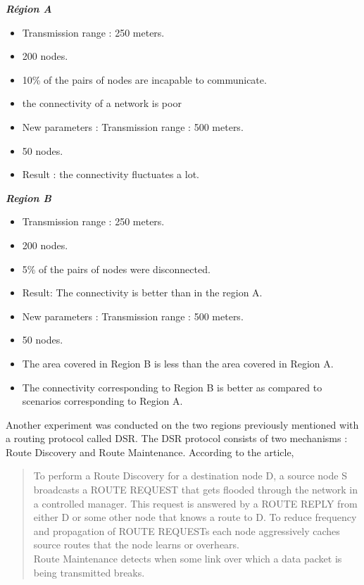 \begin{multicols}{2}
\textit{\textbf{Région A}}
\begin{itemize}
\item Transmission range : 250 meters.
\item 200 nodes.
\item 10\% of the pairs of nodes are incapable to communicate.
\item the connectivity of a network is poor
\item New parameters : Transmission range : 500 meters.
\item 50 nodes.
\item Result : the connectivity fluctuates a lot.
\end{itemize}
\columnbreak
\textit{\textbf{Region B}}
\begin{itemize}
\item Transmission range : 250 meters.
\item 200 nodes.
\item 5\% of the pairs of nodes were disconnected.
\item Result: The connectivity is better than in the region A.
\item New parameters : Transmission range : 500 meters.
\item 50 nodes.
\item The area covered in Region B is less than the area covered in Region A.
\item The connectivity corresponding to Region B is better as compared to scenarios corresponding to Region A.
\end{itemize}
\end{multicols}

Another experiment was conducted on the two regions previously mentioned with a routing protocol called DSR. The DSR protocol consists of two mechanisms : Route Discovery and Route Maintenance. According to the article, 
\begin{quotation}
To perform a Route Discovery for a destination node D, a source node S broadcasts a ROUTE REQUEST that gets flooded through the network in a controlled manager. This request is answered by a ROUTE REPLY from either D or some other node that knows a route to D. To reduce frequency and propagation of ROUTE REQUESTs each node aggressively caches source routes that the node learns or overhears.\\
Route Maintenance detects when some link over which a data packet is being transmitted breaks\cite{VehicularAdHocNetworks9}.
\end{quotation}

